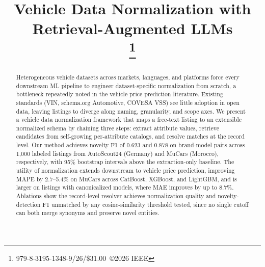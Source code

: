 \documentclass[conference]{IEEEtran}
\begin{document}
\title{Vehicle Data Normalization with Retrieval-Augmented LLMs\\
\thanks{979-8-3195-1348-9/26/\$31.00~\copyright2026 IEEE}
}

\author{
\and
{}
\and
{}
}

\maketitle

\begin{abstract}
Heterogeneous vehicle datasets across markets, languages, and
platforms force every downstream ML pipeline to engineer
dataset-specific normalization from scratch, a bottleneck
repeatedly noted in the vehicle price prediction literature. Existing
standards (VIN, schema.org Automotive, COVESA VSS) see little
adoption in open data, leaving listings to diverge along
naming, granularity, and scope axes. We present a vehicle data
normalization framework that maps a free-text listing to an
extensible normalized schema by chaining three steps: extract
attribute values, retrieve candidates from self-growing
per-attribute catalogs, and resolve matches at the record level. Our method
achieves novelty F1 of 0.623 and 0.878
on brand-model pairs across 1,000 labeled listings from AutoScout24 (Germany)
and MuCars (Morocco), respectively, with 95\% bootstrap intervals
above the extraction-only baseline.
The utility of normalization extends downstream to
vehicle price prediction, improving MAPE by
2.7--5.4\% on MuCars across CatBoost, XGBoost, and LightGBM,
and is larger on listings with canonicalized models, where MAE
improves by up to 8.7\%.
Ablations show the record-level resolver achieves
normalization quality and novelty-detection F1 unmatched by
any cosine-similarity threshold tested, since no single
cutoff can both merge synonyms and preserve novel entities.
\end{abstract}
\end{document}
